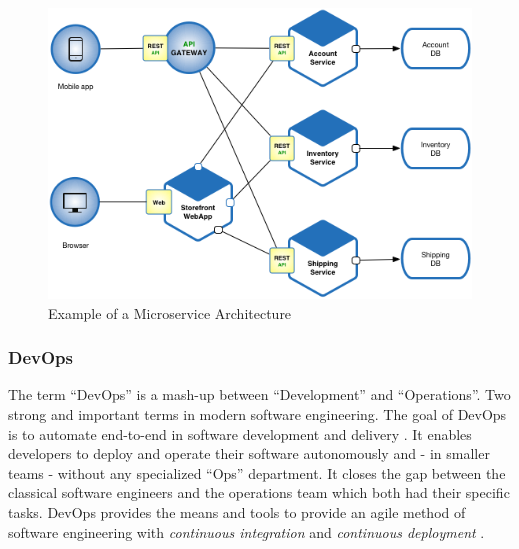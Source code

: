 \begin{figure}[h]
    \centering
    \includegraphics[width=\columnwidth]{images/Microservice_Architecture.png}
    \caption{Example of a Microservice Architecture}
\end{figure}

\subsubsection{DevOps}

The term ``DevOps'' is a mash-up between ``Development'' and ``Operations''. Two
strong and important terms in modern software engineering. The goal of DevOps is to
automate end-to-end in software development and delivery \cite{ebert:DevOps}. It enables
developers to deploy and operate their software autonomously and - in smaller teams - without
any specialized ``Ops'' department. It closes the gap between the classical
software engineers and the operations team which both had their specific tasks. DevOps
provides the means and tools to provide an agile method of software engineering with
\textit{continuous integration} and \textit{continuous deployment} \cite{huettermann:DevOps}.
